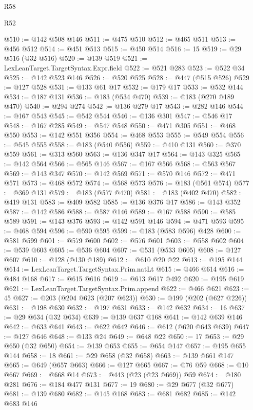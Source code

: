 \begin{lexlean}{R58}
\begin{lexlean}{R52}
\begin{coremodule}
{{{{{{{{{{{{{{{{{{{{{{{{{{{{{{{{{{{{{{{{{{{{{{{{{{{{{{{{{{{{{{{{{{{{{{{{{{{{{{{{{{{{{{{{{{{{{{{{{{{{{{{{{{{{{{{{{{{{{{{{{{{{{{{{{{{{{{{{{{{{{{{{{{{{{{{{{{{{{{{{{{{{{{{{{{{{{{{{{{{{{{{{{{{{{{{{{{{{{{@510 := @142 @508 @146
@511 := @475 @510
@512 := @465 @511
@513 := @456 @512
@514 := @451 @513
@515 := @450 @514
@516 := 15
@519 := @29 @516 (@32 @516)
@520 := @139 @519
@521 := LexLeanTarget.TargetSyntax.Expr.field
@522 := @521 @283
@523 := @522 @34
@525 := @142 @523 @146
@526 := @520 @525
@528 := @447 (@515 @526)
@529 := @127 @528
@531 := @133 @61 @17
@532 := @179 @17
@533 := @532 @144
@534 := @187 @131
@536 := @183 (@534 @470)
@539 := @183 (@270 @189 @470)
@540 := @294 @274
@542 := @136 @279 @17
@543 := @282 @146
@544 := @167 @543
@545 := @542 @544
@546 := @136 @301
@547 := @546 @17
@548 := @167 @285
@549 := @547 @548
@550 := @471 @305
@551 := @468 @550
@553 := @142 @551 @356
@554 := @468 @553
@555 := @549 @554
@556 := @545 @555
@558 := @183 (@540 @556)
@559 := @410 @131
@560 := @370 @559
@561 := @313 @560
@563 := @136 @347 @17
@564 := @143 @325
@565 := @142 @564
@566 := @565 @146
@567 := @167 @566
@568 := @563 @567
@569 := @143 @347
@570 := @142 @569
@571 := @570 @146
@572 := @471 @571
@573 := @468 @572
@574 := @568 @573
@576 := @183 (@561 @574)
@577 := @369 @131
@579 := @183 (@577 @470)
@581 := @183 (@402 @470)
@582 := @419 @131
@583 := @409 @582
@585 := @136 @376 @17
@586 := @143 @352
@587 := @142 @586
@588 := @587 @146
@589 := @167 @588
@590 := @585 @589
@591 := @143 @376
@593 := @142 @591 @146
@594 := @471 @593
@595 := @468 @594
@596 := @590 @595
@599 := @183 (@583 @596) @428
@600 := @581 @599
@601 := @579 @600
@602 := @576 @601
@603 := @558 @602
@604 := @539 @603
@605 := @536 @604
@607 := @531 (@533 @605)
@608 := @127 @607
@610 := @128 (@130 @189)
@612 := @610 @20 @22
@613 := @195 @144
@614 := LexLeanTarget.TargetSyntax.Prim.natLt
@615 := @466 @614
@616 := @484 @168
@617 := @615 @616
@619 := @613 @617 @492
@620 := @195 @619
@621 := LexLeanTarget.TargetSyntax.Prim.append
@622 := @466 @621
@623 := 45
@627 := @203 (@204 @623 (@207 @623))
@630 := @199 (@202 (@627 @226))
@631 := @198 @630
@632 := @197 @631
@633 := @142 @632
@634 := 16
@637 := @29 @634 (@32 @634)
@639 := @139 @637 @168
@641 := @142 @639 @146
@642 := @633 @641
@643 := @622 @642
@646 := @612 (@620 @643 @639)
@647 := @127 @646
@648 := @133 @24
@649 := @648 @22
@650 := 17
@653 := @29 @650 (@32 @650)
@654 := @139 @653
@655 := @654 @147
@657 := @195 @655 @144
@658 := 18
@661 := @29 @658 (@32 @658)
@663 := @139 @661 @147
@665 := @649 (@657 @663)
@666 := @127 @665
@667 := @76 @59
@668 := @10 @667
@669 := @668 @14
@673 := @443 (@23 (@23 @669)) @59
@674 := @180 @281
@676 := @184 @477 @131
@677 := 19
@680 := @29 @677 (@32 @677)
@681 := @139 @680
@682 := @145 @168
@683 := @681 @682
@685 := @142 @683 @146
}}}}}}}}}}}}}}}}}}}}}}}}}}}}}}}}}}}}}}}}}}}}}}}}}}}}}}}}}}}}}}}}}}}}}}}}}}}}}}}}}}}}}}}}}}}}}}}}}}}}}}}}}}}}}}}}}}}}}}}}}}}}}}}}}}}}}}}}}}}}}}}}}}}}}}}}}}}}}}}}}}}}}}}}}}}}}}}}}}}}}}}}}}}}}}}}}}}}}}
\end{coremodule}
\end{lexlean}
\end{lexlean}
